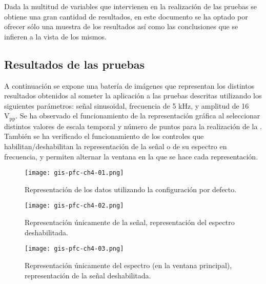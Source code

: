 Dada la multitud de variables que intervienen en la realización de las
pruebas se obtiene una gran cantidad de resultados, en este documento se ha
optado por ofrecer sólo una muestra de los resultados así como las
conclusiones que se infieren a la vista de los mismos.


\subsection{Resultados de las pruebas}

A continuación se expone una batería de imágenes que representan los
distintos resultados obtenidos al someter la aplicación a las pruebas
descritas utilizando los siguientes parámetros: señal sinusoidal,
frecuencia de 5 kHz, y amplitud de 16 $\text{V}_\text{pp}$. Se ha observado
el funcionamiento de la representación gráfica al seleccionar distintos
valores de escala temporal y número de puntos para la realización de la
. También se ha verificado el funcionamiento de los controles que
habilitan/deshabilitan la representación de la señal o de su espectro en
frecuencia, y permiten alternar la ventana en la que se hace cada
representación.

\begin{figure}
    \begin{center}
	\texttt{[image: gis-pfc-ch4-01.png]}
    \end{center}
    \caption[Representaciones obtenidas utilizando diversas
    configuraciones]{Representación de los datos utilizando la
    configuración por defecto.}
    \label{fig:test1}
\end{figure}

\begin{figure}\ContinuedFloat
    \begin{center}
	\texttt{[image: gis-pfc-ch4-02.png]}
    \end{center}
    \caption{Representación únicamente de la señal, representación del
    espectro deshabilitada.}
    \label{fig:test2}
\end{figure}

\begin{figure}\ContinuedFloat
    \begin{center}
	\texttt{[image: gis-pfc-ch4-03.png]}
    \end{center}
    \caption{Representación únicamente del espectro (en la ventana
    principal), representación de la señal deshabilitada.}
    \label{fig:test3}
\end{figure}

